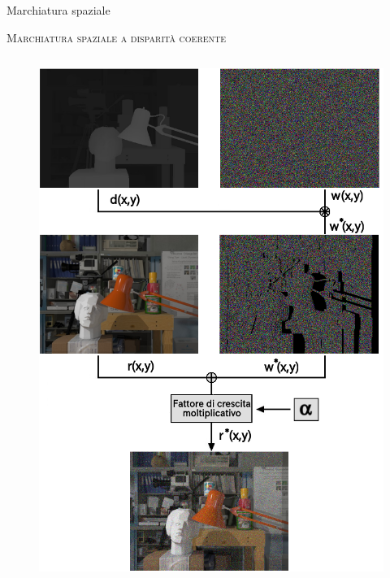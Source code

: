\documentclass{beamer}
\begin{document}
\begin{section}{Marchiatura spaziale}
\begin{frame}[t]{\textsc{Marchiatura spaziale a disparit\`{a} coerente}}
\begin{columns}
\begin{column}{5cm}
\begin{center}
\begin{figure}
\includegraphics[width=0.9\linewidth]{./img/warp.png}
\end{figure}
\end{center}
\end{column}
\end{columns}
\end{frame}


\end{section}
\end{document}
